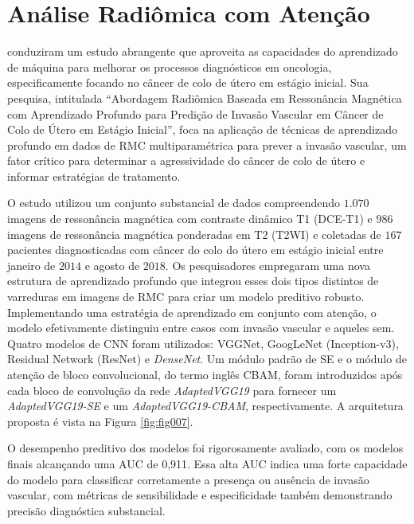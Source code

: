 \section{Análise Radiômica com Atenção}
\label{sec:analise_radiomica}

 conduziram um estudo abrangente que aproveita as capacidades do aprendizado de máquina para melhorar os processos diagnósticos em oncologia, especificamente focando no câncer de colo de útero em estágio inicial. Sua pesquisa, intitulada ``Abordagem Radiômica Baseada em Ressonância Magnética com Aprendizado Profundo para Predição de Invasão Vascular em Câncer de Colo de Útero em Estágio Inicial'', foca na aplicação de técnicas de aprendizado profundo em dados de \gls{RMC} multiparamétrica para prever a invasão vascular, um fator crítico para determinar a agressividade do câncer de colo de útero e informar estratégias de tratamento.

O estudo utilizou um conjunto substancial de dados compreendendo $1.070$ imagens de ressonância magnética com contraste dinâmico T1 (DCE-T1) e $986$ imagens de ressonância magnética ponderadas em T2 (T2WI) e coletadas de $167$ pacientes diagnosticadas com câncer do colo do útero em estágio inicial entre janeiro de $2014$ e agosto de $2018$. Os pesquisadores empregaram uma nova estrutura de aprendizado profundo que integrou esses dois tipos distintos de varreduras em imagens de \gls{RMC} para criar um modelo preditivo robusto. Implementando uma estratégia de aprendizado em conjunto com atenção, o modelo efetivamente distinguiu entre casos com invasão vascular e aqueles sem. Quatro modelos de CNN foram utilizados: VGGNet, GoogLeNet (Inception-v3), Residual Network (ResNet) e \textit{DenseNet}. Um módulo padrão de \gls{SE}  e o módulo de atenção de bloco convolucional, do termo inglês \gls{CBAM},  foram introduzidos após cada bloco de convolução da rede \textit{AdaptedVGG19} para fornecer um \textit{AdaptedVGG19-SE} e um \textit{AdaptedVGG19-CBAM}, respectivamente. A arquitetura proposta é vista na Figura \ref{fig:fig007}.

O desempenho preditivo dos modelos foi rigorosamente avaliado, com os modelos finais alcançando uma \gls{AUC} de 0,911. Essa alta \gls{AUC} indica uma forte capacidade do modelo para classificar corretamente a presença ou ausência de invasão vascular, com métricas de sensibilidade e especificidade também demonstrando precisão diagnóstica substancial.

